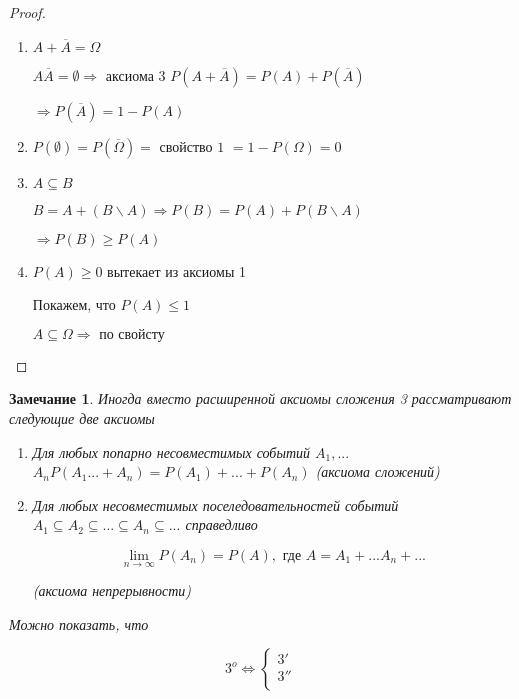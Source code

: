 \documentclass[a4paper, 14pt]{report}
\newtheorem{note}{Замечание}[chapter]
\begin{document}
\begin{proof}
    \begin{enumerate}
        \item $A + \overline{A} = \Omega$

            $A \overline{A} = \emptyset \Rightarrow \text{ аксиома 3 } P(A + \overline{A}) = P(A) + P(\overline{A})$

            $\Rightarrow P(\overline{A}) = 1 - P(A)$

        \item $P(\emptyset) = P(\overline{\Omega}) = \text{ свойство 1 } = 1 - P(\Omega) = 0$

        \item $A \subseteq B$

            $B = A + (B \backslash A) \Rightarrow P(B) = P(A) + P(B \backslash A)$

            $\Rightarrow P(B) \geq P(A)$

        \item $P(A) \geq 0$ вытекает из аксиомы 1

            Покажем, что $P(A) \le 1$

            $A \subseteq \Omega \Rightarrow \text{ по свойсту}$
    \end{enumerate}
\end{proof}

%
%
%
%
%

\begin{note}
    Иногда вместо расширенной аксиомы сложения 3 рассматривают следующие две аксиомы

    \begin{enumerate}
        \item[3')] Для любых попарно несовместимых событий $A_1,...$ $A_n P(A_1...+A_n) = P(A_1) + ... + P(A_n)$ (аксиома сложений)

        \item[3'')] Для любых несовместимых поселедовательностей событий $A_1 \subseteq A_2 \subseteq ... \subseteq A_n \subseteq ...$ справедливо

            $$
            \lim_{n \to \infty} P(A_n) = P(A), \text{ где } A = A_1 + ... A_n + ...
            $$

            (аксиома непрерывности)
    \end{enumerate}

    Можно показать, что

    $$
    3^o \Leftrightarrow
    \begin{cases}
        3' \\
        3'' \\
    \end{cases}
    $$
\end{note}
\end{document}
